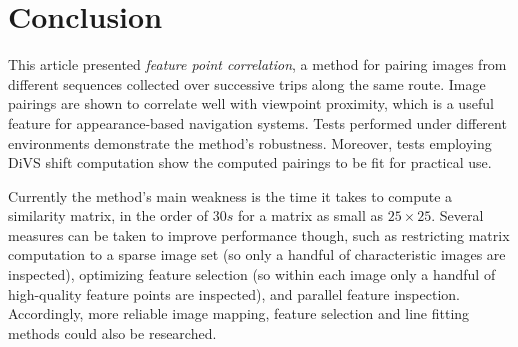 \documentclass[twocolumn, 9pt,fleqn]{jsproceedings}
\begin{document}
\section{Conclusion}

This article presented \textit{feature point correlation}, a method for pairing images from different sequences collected over successive trips along the same route. Image pairings are shown to correlate well with viewpoint proximity, which is a useful feature for appearance-based navigation systems. Tests performed under different environments demonstrate the method's robustness. Moreover, tests employing DiVS shift computation show the computed pairings to be fit for practical use.

Currently the method's main weakness is the time it takes to compute a similarity matrix, in the order of $30s$ for a matrix as small as $25 \times 25$. Several measures can be taken to improve performance though, such as restricting matrix computation to a sparse image set (so only a handful of characteristic images are inspected), optimizing feature selection (so within each image only a handful of high-quality feature points are inspected), and parallel feature inspection. Accordingly, more reliable image mapping, feature selection and line fitting methods could also be researched.

\footnotesize




\normalsize
\end{document}
